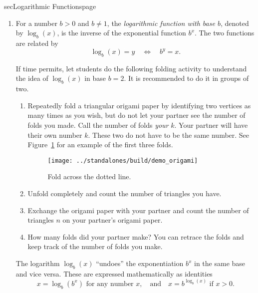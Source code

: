 \documentclass[../main]{subfiles}
\begin{document}
\begin{outline}{sec}{Logarithmic Functions}{page} \label{outline:logs}
  \begin{enumerate}
    \item For a number \(b > 0\) and \(b \ne 1\), the \emph{logarithmic function with base \(b\)}, denoted by \(\log_{b}(x)\), is the inverse of the exponential function \(b^{x}\). The two functions are related by
      \[
        \log_{b}(x) = y \quad \Longleftrightarrow \quad b^{y} = x.
      \]

      If time permits, let students do the following folding activity to understand the idea of \(\log_{b}(x)\) in base \(b = 2\).  It is recommended to do it in groups of two.
      \begin{enumerate}
        \item Repeatedly fold a triangular origami paper by identifying two vertices as many times as you wish, but do not let your partner see the number of folds you made. Call the number of folds \emph{your} \(k\). Your partner will have their own number \(k\). These two do not have to be the same number. See Figure~\ref{fig:origami} for an example of the first three folds.
          \begin{figure}[h]
            \centering
            \texttt{[image: ../standalones/build/demo\_origami]}
            \caption{Fold across the dotted line.}
            \label{fig:origami}
          \end{figure}
          
        \item Unfold completely and count the number of triangles you have. 
        \item Exchange the origami paper with your partner and count the number of triangles \(n\) on your partner's origami paper. 
        \item How many folds did your partner make? You can retrace the folds and keep track of the number of folds you make. 
      \end{enumerate} 
      {The logarithm \(\log_{b}(x)\) ``undoes'' the exponentiation \(b^{x}\) in the same base and vice versa.  These are expressed mathematically as identities
      \[
        x = \log_{b}(b^{x}) \text{ for any number } x, \quad\text{and}\quad x = b^{\log_{b}(x)} \text{ if } x > 0.
      \]
    }
      

\end{enumerate}
\end{outline}
\end{document}
